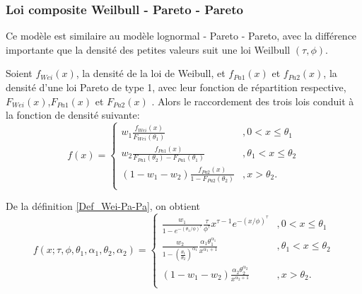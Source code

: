 	\subsubsection{Loi composite Weilbull - Pareto - Pareto} 
	Ce modèle est similaire au modèle lognormal - Pareto - Pareto, avec la différence importante que la densité des petites valeurs suit une loi Weilbull $(\tau,\phi)$.
	\begin{Definition}\label{Def_Wei-Pa-Pa}
		Soient $f_{Wei}(x)$, la densité de la loi de Weibull, et $f_{Pa1}(x)$ et $f_{Pa2}(x)$, la densité d'une loi Pareto de type 1, avec leur fonction de répartition respective,  $F_{Wei}(x)$,$F_{Pa1}(x)$ et $F_{Pa2}(x)$ . Alors le raccordement des trois lois conduit à la fonction de densité suivante:
		$$
		f(x) = \left\{
		\begin{array}{ll}
			w_1 \frac{f_{Wei}(x)}{F_{Wei}(\theta_1)} & ,0 < x \leq \theta_1 \\
			w_2 \frac{f_{Pa1}(x)}{F_{Pa1}(\theta_2)-F_{Pa1}(\theta_1)} & ,\theta_1 < x \leq \theta_2 \\
			(1-w_1-w_2) \frac{f_{Pa2}(x)}{1-F_{Pa2}(\theta_2)} & ,x >\theta_2.  \\
		\end{array}
		\right.
		$$
	\end{Definition}
	De la définition \ref{Def_Wei-Pa-Pa}, on obtient
	$$
		f(x;\tau,\phi,\theta_1,\alpha_1,\theta_2,\alpha_2) = \left\{
		\begin{array}{ll}
			\frac{w_1}{1-e^{-\left(\theta_1/\phi\right)^{\tau}}} \frac{\tau}{\phi^{\tau}} x^{\tau -1} e^{- \left(x/\phi\right)^{\tau} }& ,0 < x \leq \theta_1 \\
			\frac{w_2}{1-\left(\frac{\theta_1}{\theta_2}\right)^{\alpha_1}} \frac{\alpha_1 \theta_1^{\alpha_1}}{x^{\alpha_1+1}}  & ,\theta_1 < x \leq \theta_2 \\
			(1-w_1-w_2) \frac{\alpha_2 \theta_2^{\alpha_2}}{x^{\alpha_2+1}}  & ,x > \theta_2.  \\
		\end{array}
		\right.
	$$	

